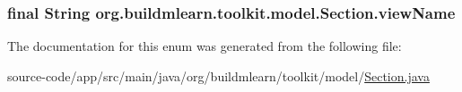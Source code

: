 \subsubsection[{\texorpdfstring{view\+Name}{viewName}}]{\setlength{\rightskip}{0pt plus 5cm}final String org.\+buildmlearn.\+toolkit.\+model.\+Section.\+view\+Name\hspace{0.3cm}{\ttfamily [private]}}\hypertarget{enumorg_1_1buildmlearn_1_1toolkit_1_1model_1_1Section_af21ab2867b4154f9869eab7856f3a658}{}\label{enumorg_1_1buildmlearn_1_1toolkit_1_1model_1_1Section_af21ab2867b4154f9869eab7856f3a658}


The documentation for this enum was generated from the following file\+:\begin{DoxyCompactItemize}
\item 
source-\/code/app/src/main/java/org/buildmlearn/toolkit/model/\hyperlink{Section_8java}{Section.\+java}\end{DoxyCompactItemize}
